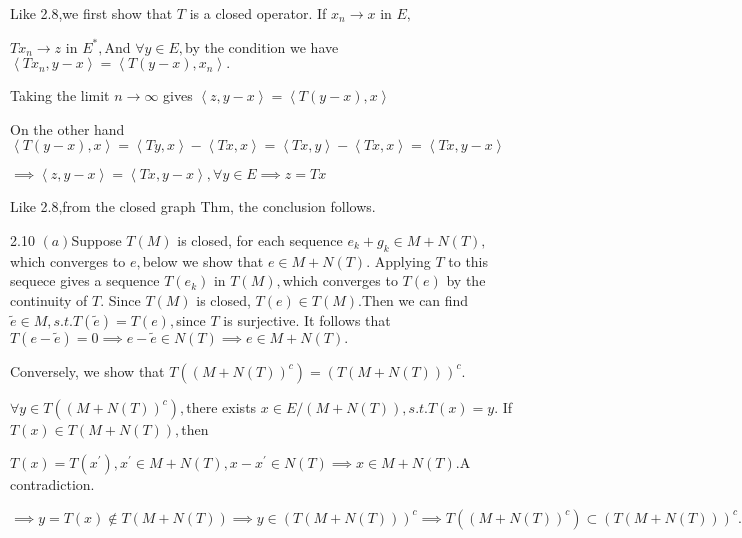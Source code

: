 \documentclass{article}
\begin{document}
Like 2.8,we first show that $T$ is a closed operator. If $x_{n}\rightarrow x$
in $E,$

$Tx_{n}\rightarrow z$ in $E^{\ast },$And $\forall y\in E,$by the condition
we have $\left\langle Tx_{n},y-x\right\rangle =\left\langle T\left(
y-x\right) ,x_{n}\right\rangle .$

Taking the limit $n\rightarrow \infty $ gives $\left\langle
z,y-x\right\rangle =\left\langle T\left( y-x\right) ,x\right\rangle $

On the other hand $\left\langle T\left( y-x\right) ,x\right\rangle
=\left\langle Ty,x\right\rangle -\left\langle Tx,x\right\rangle
=\left\langle Tx,y\right\rangle -\left\langle Tx,x\right\rangle
=\left\langle Tx,y-x\right\rangle $

$\implies \left\langle z,y-x\right\rangle =\left\langle Tx,y-x\right\rangle
,\forall y\in E\implies z=Tx$

\bigskip Like 2.8,from the closed graph Thm, the conclusion follows.

2.10 $\left( a\right) $Suppose $T\left( M\right) $ is closed, for each
sequence $e_{k}+g_{k}\in M+N\left( T\right) ,$which converges to $e,$below
we show that $e\in M+N\left( T\right) .$ Applying $T$ to this sequece gives
a sequence $T\left( e_{k}\right) $ in $T\left( M\right) ,$which converges to 
$T\left( e\right) $ by the continuity of $T$. Since $T\left( M\right) $ is
closed, $T\left( e\right) \in T\left( M\right) .$Then we can find $\tilde{e}%
\in M,s.t.T\left( \tilde{e}\right) =T\left( e\right) ,$since $T$ is
surjective. It follows that $T\left( e-\tilde{e}\right) =0\implies e-\tilde{e%
}\in N\left( T\right) \implies e\in M+N\left( T\right) .$

Conversely, we show that $T\left( \left( M+N\left( T\right) \right)
^{c}\right) =\left( T\left( M+N\left( T\right) \right) \right) ^{c}.$

$\forall y\in T\left( \left( M+N\left( T\right) \right) ^{c}\right) ,$there
exists $x\in E/\left( M+N\left( T\right) \right) ,s.t.T\left( x\right) =y.$
If $T\left( x\right) \in T\left( M+N\left( T\right) \right) ,$then

$T\left( x\right) =T\left( x^{\prime }\right) ,x^{\prime }\in M+N\left(
T\right) ,x-x^{\prime }\in N\left( T\right) \implies x\in M+N\left( T\right)
.$A contradiction.

$\implies y=T\left( x\right) \notin T\left( M+N\left( T\right) \right)
\implies y\in \left( T\left( M+N\left( T\right) \right) \right) ^{c}\implies
T\left( \left( M+N\left( T\right) \right) ^{c}\right) \subset \left( T\left(
M+N\left( T\right) \right) \right) ^{c}.$
\end{document}
